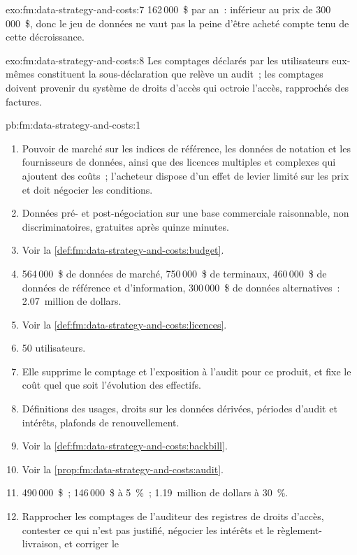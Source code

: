 \begin{solution}{exo:fm:data-strategy-and-costs:7}
162\,000~\$ par an~: inférieur au prix de 300\,000~\$, donc le jeu de données ne vaut pas la peine d'être acheté compte tenu de cette décroissance.
\end{solution}

\begin{solution}{exo:fm:data-strategy-and-costs:8}
Les comptages déclarés par les utilisateurs eux-mêmes constituent la sous-déclaration que relève un audit~; les comptages doivent provenir du système de droits d'accès qui octroie l'accès, rapprochés
des factures.
\end{solution}

\begin{solution}{pb:fm:data-strategy-and-costs:1}
\begin{enumerate}
\item Pouvoir de marché sur les indices de référence, les données de notation et les fournisseurs de données, ainsi que des licences multiples et complexes qui ajoutent des coûts~; l'acheteur dispose d'un effet de levier limité
sur les prix et doit négocier les conditions.
\item Données pré- et post-négociation sur une base commerciale raisonnable, non discriminatoires, gratuites après quinze minutes.
\item Voir la \cref{def:fm:data-strategy-and-costs:budget}.
\item 564\,000~\$ de données de marché, 750\,000~\$ de terminaux, 460\,000~\$ de données de référence et d'information, 300\,000~\$ de données alternatives~: 2.07~million de dollars.
\item Voir la \cref{def:fm:data-strategy-and-costs:licences}.
\item 50 utilisateurs.
\item Elle supprime le comptage et l'exposition à l'audit pour ce produit, et fixe le coût quel que soit l'évolution des effectifs.
\item Définitions des usages, droits sur les données dérivées, périodes d'audit et intérêts, plafonds de renouvellement.
\item Voir la \cref{def:fm:data-strategy-and-costs:backbill}.
\item Voir la \cref{prop:fm:data-strategy-and-costs:audit}.
\item 490\,000~\$~; 146\,000~\$ à 5~\%~; 1.19~million de dollars à 30~\%.
\item Rapprocher les comptages de l'auditeur des registres de droits d'accès, contester ce qui n'est pas justifié, négocier les intérêts et le règlement-livraison, et corriger le

\end{enumerate}
\end{solution}
